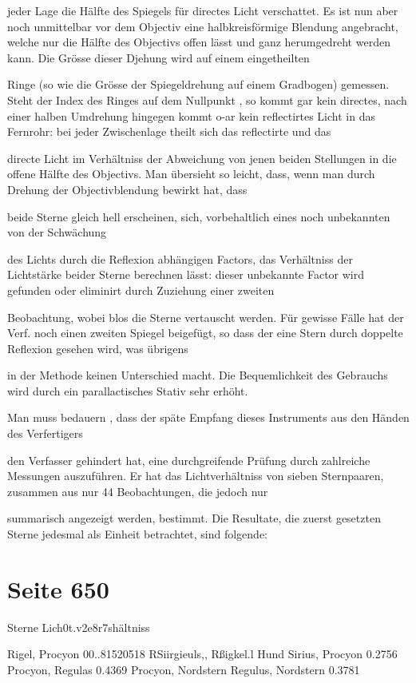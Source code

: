 \documentclass[10pt,a4paper]{article}
\begin{document}
jeder Lage die Hälfte des Spiegels für directes Licht verschattet. Es ist nun aber noch unmittelbar vor dem Objectiv eine halbkreisförmige Blendung angebracht, welche nur die Hälfte des Objectivs offen lässt und ganz herumgedreht werden kann. Die Grösse dieser Djehung wird auf einem eingetheilten

Ringe (so wie die Grösse der Spiegeldrehung auf einem Gradbogen) gemessen. Steht der Index des Ringes auf dem Nullpunkt , so kommt gar kein directes, nach einer halben Umdrehung hingegen kommt o-ar kein reflectirtes Licht in das Fernrohr: bei jeder Zwischenlage theilt sich das reflectirte und das

directe Licht im Verhältniss der Abweichung von jenen beiden Stellungen in die offene Hälfte des Objectivs. Man übersieht so leicht, dass, wenn man durch Drehung der Objectivblendung bewirkt hat, dass

beide Sterne gleich hell erscheinen, sich, vorbehaltlich eines noch unbekannten von der Schwächung

des Lichts durch die Reflexion abhängigen Factors, das Verhältniss der Lichtstärke beider Sterne berechnen lässt: dieser unbekannte Factor wird gefunden oder eliminirt durch Zuziehung einer zweiten

Beobachtung, wobei blos die Sterne vertauscht werden. Für gewisse Fälle hat der Verf. noch einen zweiten Spiegel beigefügt, so dass der eine Stern durch doppelte Reflexion gesehen wird, was übrigens

in der Methode keinen Unterschied macht. Die Bequemlichkeit des Gebrauchs wird durch ein parallactisches Stativ sehr erhöht.

Man muss bedauern , dass der späte Empfang dieses Instruments aus den Händen des Verfertigers

den Verfasser gehindert hat, eine durchgreifende Prüfung durch zahlreiche Messungen auszuführen. Er hat das Lichtverhältniss von sieben Sternpaaren, zusammen aus nur 44 Beobachtungen, die jedoch nur

summarisch angezeigt werden, bestimmt. Die Resultate, die zuerst gesetzten Sterne jedesmal als Einheit betrachtet, sind folgende:


\newpage
\section*{Seite 650}
Sterne Lich0t.v2e8r7shältniss

Rigel, Procyon 00..81520518 RSiirgieuls,, Rßigkel.l Hund Sirius, Procyon 0.2756 Procyon, Regulas 0.4369 Procyon, Nordstern Regulus, Nordstern 0.3781
\end{document}
